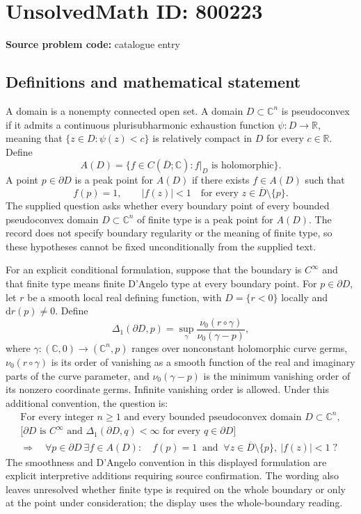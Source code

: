 \documentclass[11pt]{article}
\newcommand{\R}{\mathbb{R}}
\newcommand{\C}{\mathbb{C}}
\begin{document}
\section*{UnsolvedMath ID: 800223}
\textbf{Source problem code:} catalogue entry
\subsection{Definitions and mathematical statement}
A domain is a nonempty connected open set. A domain \(D\subset\C^n\) is pseudoconvex if it admits a continuous plurisubharmonic exhaustion function \(\psi:D\to\R\), meaning that \(\{z\in D:\psi(z)<c\}\) is relatively compact in \(D\) for every \(c\in\R\). Define
\[
A(D)=\{f\in C(\overline D;\C):f|_D\text{ is holomorphic}\}.
\]
A point \(p\in\partial D\) is a peak point for \(A(D)\) if there exists \(f\in A(D)\) such that
\[
f(p)=1,\qquad |f(z)|<1\quad\text{for every }z\in\overline D\setminus\{p\}.
\]
The supplied question asks whether every boundary point of every bounded pseudoconvex domain \(D\subset\C^n\) of finite type is a peak point for \(A(D)\). The record does not specify boundary regularity or the meaning of finite type, so these hypotheses cannot be fixed unconditionally from the supplied text.

For an explicit conditional formulation, suppose that the boundary is \(C^\infty\) and that finite type means finite D'Angelo type at every boundary point. For \(p\in\partial D\), let \(r\) be a smooth local real defining function, with \(D=\{r<0\}\) locally and \(\mathrm{d}r(p)\ne0\). Define
\[
\Delta_1(\partial D,p)=\sup_{\gamma}\frac{\nu_0(r\circ\gamma)}{\nu_0(\gamma-p)},
\]
where \(\gamma:(\C,0)\to(\C^n,p)\) ranges over nonconstant holomorphic curve germs, \(\nu_0(r\circ\gamma)\) is its order of vanishing as a smooth function of the real and imaginary parts of the curve parameter, and \(\nu_0(\gamma-p)\) is the minimum vanishing order of its nonzero coordinate germs. Infinite vanishing order is allowed. Under this additional convention, the question is:
\[
\begin{gathered}
\text{For every integer }n\ge1\text{ and every bounded pseudoconvex domain }D\subset\C^n,\\
\bigl[\partial D\text{ is }C^\infty\text{ and }\Delta_1(\partial D,q)<\infty\text{ for every }q\in\partial D\bigr]\\
\Longrightarrow\quad
\forall p\in\partial D\ \exists f\in A(D):\quad
f(p)=1\ \text{ and }\ \forall z\in\overline D\setminus\{p\},\ |f(z)|<1\;?
\end{gathered}
\]
The smoothness and D'Angelo convention in this displayed formulation are explicit interpretive additions requiring source confirmation. The wording also leaves unresolved whether finite type is required on the whole boundary or only at the point under consideration; the display uses the whole-boundary reading.
\end{document}
